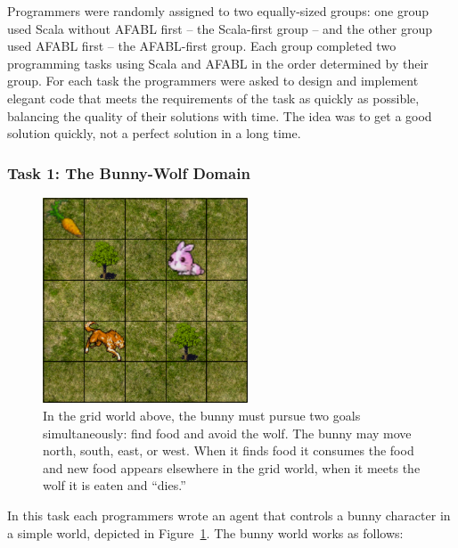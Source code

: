 Programmers were randomly assigned to two equally-sized groups: one group used Scala without AFABL first -- the Scala-first group -- and the other group used AFABL first -- the AFABL-first group.  Each group completed two programming tasks using Scala and AFABL in the order determined by their group.  For each task the programmers were asked to design and implement elegant code that meets the requirements of the task as quickly as possible, balancing the quality of their solutions with time.  The idea was to get a good solution quickly, not a perfect solution in a long time.

\subsubsection{Task 1: The Bunny-Wolf Domain}\label{sec:task1}

\begin{figure}[h]

\begin{center}
\includegraphics[height=2.4in]{bunny.png}
\end{center}


\caption{In the grid world above, the bunny must pursue two goals
  simultaneously: find food and avoid the wolf.  The bunny may move
  north, south, east, or west.  When it finds food it consumes the
  food and new food appears elsewhere in the grid world, when it meets
  the wolf it is eaten and ``dies.''}
\label{fig:bunny-picture}
\end{figure}

In this task each programmers wrote an agent that controls a bunny character in a simple world, depicted in Figure~\ref{fig:bunny-picture}.  The bunny world works as follows:

